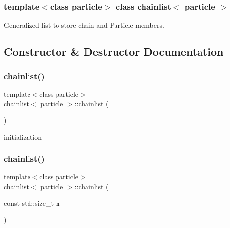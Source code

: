 \subsubsection*{template$<$class particle$>$\newline
class chainlist$<$ particle $>$}

Generalized list to store chain and \hyperlink{classParticle}{Particle} members. 

\subsection{Constructor \& Destructor Documentation}
\hypertarget{classchainlist_a13b0a9849f6b7739838ff2650f87ab77}{}\label{classchainlist_a13b0a9849f6b7739838ff2650f87ab77} 
\subsubsection{\texorpdfstring{chainlist()}{chainlist()}\hspace{0.1cm}{\footnotesize\ttfamily [1/2]}}
{\footnotesize\ttfamily template$<$class particle$>$ \\
\hyperlink{classchainlist}{chainlist}$<$ particle $>$\+::\hyperlink{classchainlist}{chainlist} (\begin{DoxyParamCaption}{ }\end{DoxyParamCaption})\hspace{0.3cm}{\ttfamily [inline]}}



initialization 

\hypertarget{classchainlist_a83cda067438cef02618f7cb042d8273b}{}\label{classchainlist_a83cda067438cef02618f7cb042d8273b} 
\subsubsection{\texorpdfstring{chainlist()}{chainlist()}\hspace{0.1cm}{\footnotesize\ttfamily [2/2]}}
{\footnotesize\ttfamily template$<$class particle$>$ \\
\hyperlink{classchainlist}{chainlist}$<$ particle $>$\+::\hyperlink{classchainlist}{chainlist} (\begin{DoxyParamCaption}\item[{const std\+::size\+\_\+t}]{n }\end{DoxyParamCaption})\hspace{0.3cm}{\ttfamily [inline]}}

